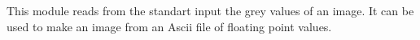 This module reads from the standart input the grey values of an image.
It can be used to make an image from an Ascii file of floating point values.
